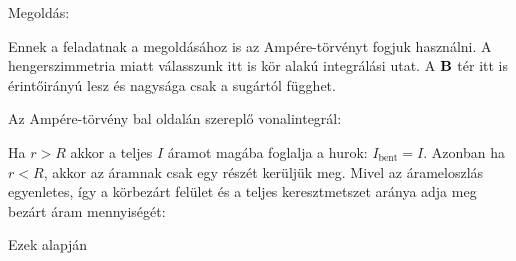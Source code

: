 
\ifdefined\megoldas

 Megoldás: 

 Ennek a feladatnak a megoldásához is az Amp\'ere-törvényt fogjuk használni. A hengerszimmetria miatt válasszunk itt is kör alakú integrálási utat. A $\mathbf{B}$ tér itt is érintőirányú lesz és nagysága csak a sugártól függhet. 

 Az Amp\'ere-törvény bal oldalán szereplő vonalintegrál:

 Ha $r>R$ akkor a teljes $I$ áramot magába foglalja a hurok: $I_\text{bent}=I$. Azonban ha $r<R$, akkor az áramnak csak egy részét kerüljük meg. Mivel az árameloszlás egyenletes, így a körbezárt felület és a teljes keresztmetszet aránya adja meg bezárt áram mennyiségét:

 Ezek alapján
 
\fi